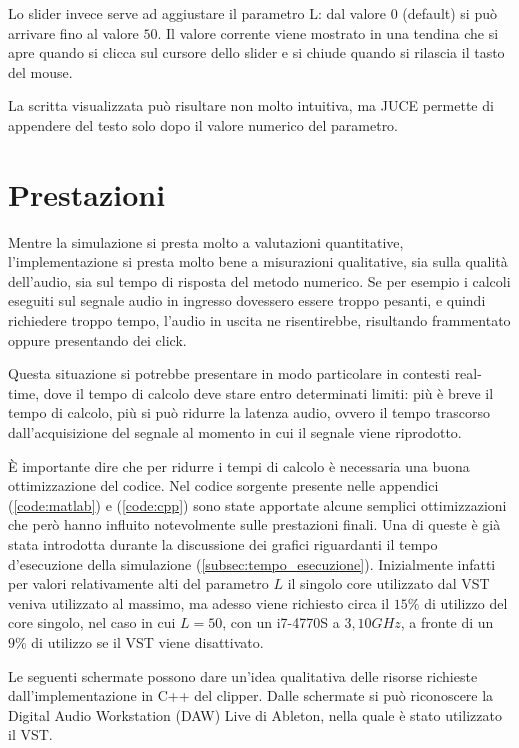		Lo slider invece serve ad aggiustare il parametro L: dal valore $0$ (default) si può arrivare fino al valore $50$. Il valore corrente viene mostrato in una tendina che si apre quando si clicca sul cursore dello slider e si chiude quando si rilascia il tasto del mouse.
		
		La scritta visualizzata può risultare non molto intuitiva, ma JUCE permette di appendere del testo solo dopo il valore numerico del parametro.
	
	\section{Prestazioni}
		Mentre la simulazione si presta molto a valutazioni quantitative, l'implementazione si presta molto bene a misurazioni qualitative, sia sulla qualità dell'audio, sia sul tempo di risposta del metodo numerico. Se per esempio i calcoli eseguiti sul segnale audio in ingresso dovessero essere troppo pesanti, e quindi richiedere troppo tempo, l'audio in uscita ne risentirebbe, risultando frammentato oppure presentando dei click.
		
		Questa situazione si potrebbe presentare in modo particolare in contesti real-time, dove il tempo di calcolo deve stare entro determinati limiti: più è breve il tempo di calcolo, più si può ridurre la latenza audio, ovvero il tempo trascorso dall'acquisizione del segnale al momento in cui il segnale viene riprodotto.
		
		È importante dire che per ridurre i tempi di calcolo è necessaria una buona ottimizzazione del codice. Nel codice sorgente presente nelle appendici (\ref{code:matlab}) e (\ref{code:cpp}) sono state apportate alcune semplici ottimizzazioni che però hanno influito notevolmente sulle prestazioni finali. Una di queste è già stata introdotta durante la discussione dei grafici riguardanti il tempo d'esecuzione della simulazione (\ref{subsec:tempo_esecuzione}). Inizialmente infatti per valori relativamente alti del parametro $L$ il singolo core utilizzato dal VST veniva utilizzato al massimo, ma adesso viene richiesto circa il $15\%$ di utilizzo del core singolo, nel caso in cui $L = 50$, con un i7-4770S a $3,10GHz$, a fronte di un $9\%$ di utilizzo se il VST viene disattivato.
		
		Le seguenti schermate possono dare un'idea qualitativa delle risorse richieste dall'implementazione in C++ del clipper. Dalle schermate si può riconoscere la Digital Audio Workstation (DAW) Live di Ableton, nella quale è stato utilizzato il VST.
		
